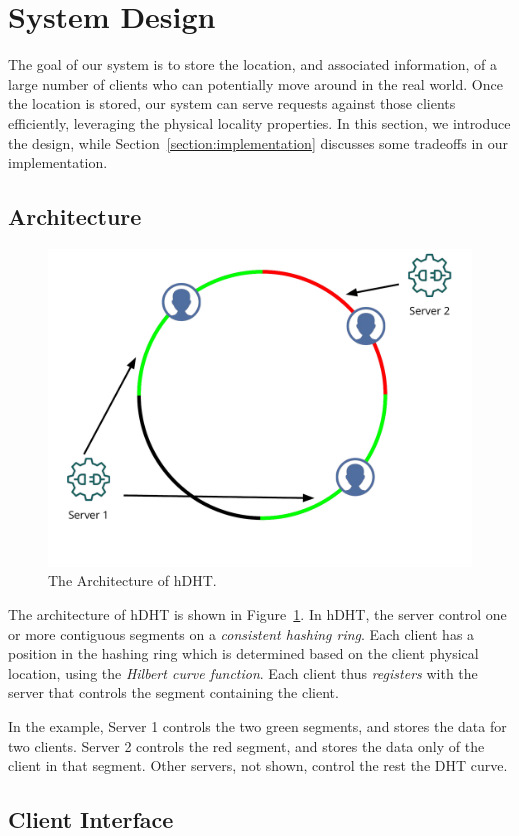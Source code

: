 \section{System Design} \label{section:design}

The goal of our system is to store the location, and associated information, of a large number of clients who can potentially move around in the real world.
Once the location is stored, our system can serve requests against those clients efficiently, leveraging the physical locality properties.
In this section, we introduce the design, while Section~\ref{section:implementation} discusses some tradeoffs in our implementation.

\subsection{Architecture}

\begin{figure}
\centering
\includegraphics[width=0.6\linewidth]{figures/arch.pdf}
\caption{The Architecture of hDHT.}
\label{fig:arch}
\end{figure}

The architecture of hDHT is shown in Figure~\ref{fig:arch}.
In hDHT, the server control one or more contiguous segments on a \textit{consistent hashing ring}.
Each client has a position in the hashing ring which is determined based on the client physical location, using the \textit{Hilbert curve function}.
Each client thus \textit{registers} with the server that controls the segment containing the client.

In the example, Server 1 controls the two green segments, and stores the data for two clients.
Server 2 controls the red segment, and stores the data only of the client in that segment.
Other servers, not shown, control the rest the DHT curve.

\subsection{Client Interface}

